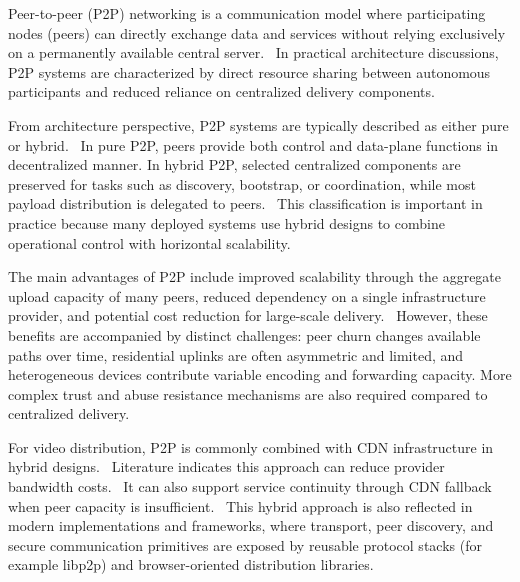 Peer-to-peer (\ac{P2P}) networking is a communication model where participating nodes (peers) can directly exchange data and services without relying exclusively on a permanently available central server.~\cite{xuAnalysisCDNP2P2006} In practical architecture discussions, \ac{P2P} systems are characterized by direct resource sharing between autonomous participants and reduced reliance on centralized delivery components.~\cite{xuAnalysisCDNP2P2006}

From architecture perspective, \ac{P2P} systems are typically described as either pure or hybrid.~\cite{meskovicContentDeliveryArchitectures2012} In pure \ac{P2P}, peers provide both control and data-plane functions in decentralized manner. In hybrid \ac{P2P}, selected centralized components are preserved for tasks such as discovery, bootstrap, or coordination, while most payload distribution is delegated to peers.~\cite{meskovicContentDeliveryArchitectures2012} This classification is important in practice because many deployed systems use hybrid designs to combine operational control with horizontal scalability.~\cite{meskovicContentDeliveryArchitectures2012}

The main advantages of \ac{P2P} include improved scalability through the aggregate upload capacity of many peers, reduced dependency on a single infrastructure provider, and potential cost reduction for large-scale delivery.~\cite{xuAnalysisCDNP2P2006,meskovicContentDeliveryArchitectures2012} However, these benefits are accompanied by distinct challenges: peer churn changes available paths over time, residential uplinks are often asymmetric and limited, and heterogeneous devices contribute variable encoding and forwarding capacity. More complex trust and abuse resistance mechanisms are also required compared to centralized delivery.~\cite{xuAnalysisCDNP2P2006,meskovicContentDeliveryArchitectures2012,SecurityConsiderations}

For video distribution, \ac{P2P} is commonly combined with \ac{CDN} infrastructure in hybrid designs.~\cite{meskovicContentDeliveryArchitectures2012} Literature indicates this approach can reduce provider bandwidth costs.~\cite{xuAnalysisCDNP2P2006} It can also support service continuity through \ac{CDN} fallback when peer capacity is insufficient.~\cite{xuAnalysisCDNP2P2006} This hybrid approach is also reflected in modern implementations and frameworks, where transport, peer discovery, and secure communication primitives are exposed by reusable protocol stacks (for example libp2p) and browser-oriented distribution libraries.~\cite{Libp2pIPFSDocs,NovageP2pmedialoader2025}

